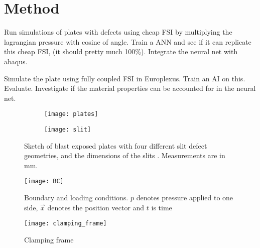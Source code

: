 \chapter{Method} \label{CH4}
Run simulations of plates with defects using cheap FSI by multiplying the lagrangian pressure with cosine of angle. Train a ANN and see if it can replicate this cheap FSI, (it should pretty much 100\%). Integrate the neural net with abaqus.

Simulate the plate using fully coupled FSI in Europlexus. Train an AI on this. Evaluate. Investigate if the material properties can be accounted for in the neural net.

\begin{figure}
    \centering
    \begin{subfigure}[b]{0.6\textwidth}
        \centering
        \texttt{[image: plates]}
        \caption{}
        \label{fig:plates}
    \end{subfigure}
    \begin{subfigure}[b]{0.39\textwidth}
        \centering
        \texttt{[image: slit]}
        \caption{}
        \label{fig:slit}
    \end{subfigure}
    \caption{Sketch of  blast exposed plates with four different slit defect geometries, and  the dimensions of the slits . Measurements are in mm.}
\end{figure}

\begin{figure}
    \centering
    \texttt{[image: BC]}
    \caption{Boundary and loading conditions. $p$ denotes pressure applied to one side, $\vec{x}$ denotes the position vector and $t$ is time}
    \label{fig:bc}
\end{figure}

\begin{figure}
    \centering
    \texttt{[image: clamping\_frame]}
    \caption{Clamping frame}
    \label{fig:clamping}
\end{figure}